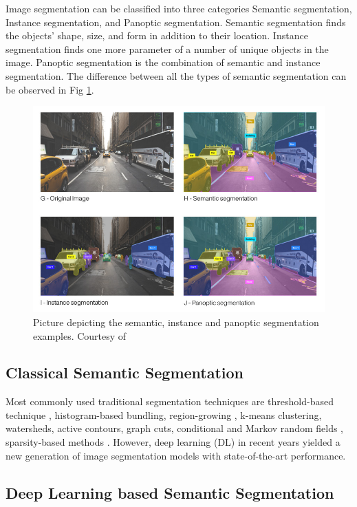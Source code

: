 	Image segmentation can be classified into three categories Semantic segmentation, Instance segmentation, and Panoptic segmentation. 
	Semantic segmentation finds the objects' shape, size, and form in addition to their location. Instance segmentation finds one more parameter of a number of unique objects in the image. Panoptic segmentation is the combination of semantic and instance segmentation. The difference between all the types of semantic segmentation can be observed in Fig \ref{fig:SS}.
    
    \begin{figure}[h]
    	\centering
    	\includegraphics[width=12cm]{images/ss.jpg}
    	\caption{Picture depicting the semantic, instance and panoptic segmentation examples. Courtesy of \cite{55_WinNT}}
    	\label{fig:SS}
    \end{figure}
    
    \subsection{Classical Semantic Segmentation}
    
	 Most commonly used traditional segmentation techniques are threshold-based technique \cite{56_otsu1979threshold}, histogram-based bundling, region-growing \cite{57_otsu1979threshold}, k-means clustering, watersheds, active contours, graph cuts, conditional and Markov random fields \cite{58_boykov2001fast}, sparsity-based methods \cite{59_starck2005image}. However, deep learning (DL) in recent years yielded a new generation of image segmentation models with state-of-the-art performance. 
    
    \subsection{Deep Learning based  Semantic Segmentation}
    
